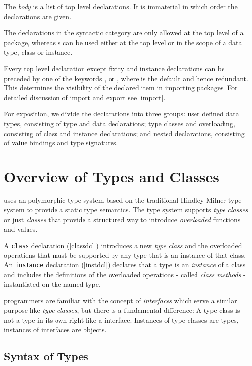
The \emph{body} is a list of top level declarations. It is immaterial in which order the declarations are given.

The declarations in the syntactic category  are only allowed at the top level of a \frege{} package, whereas s can be used either at the top level or in the scope of a data type, class or instance.

Every top level declaration except fixity and instance declarations can be preceded by one of the keywords ,  or , where  is the default and hence redundant. This determines the visibility of the declared item in importing packages. For detailed discussion of import and export see \autoref{import}.

For exposition, we divide the declarations into three groups: user defined data types, consisting of type and data declarations; type classes and overloading, consisting of class and instance declarations; and nested declarations, consisting of value bindings and type signatures.

\section{Overview of Types and Classes}
\frege{} uses an polymorphic type system based on the traditional Hindley-Milner type system \cite{ptifart} to provide a static type semantics. The type system supports \emph{type classes} or just \emph{classes} that provide a structured way to introduce \emph{overloaded} functions and values.

A \texttt{class} declaration (\autoref{classdcl}) introduces a new \emph{type class} and the overloaded operations that must be supported by any type that is an instance of that class. An \texttt{instance} declaration (\autoref{instdcl}) declares that a type is an \emph{instance} of a class and includes the definitions of the overloaded operations - called \emph{class methods} - instantiated on the named type.  

\java{} programmers are familiar with the concept of \emph{interfaces} which serve a similar purpose like \emph{type classes}, but there is a fundamental difference: A \frege{} type class is not a type in its own right like a \java{} interface. Instances of type classes are types, instances of \java{} interfaces are objects.

\subsection{Syntax of Types}   \label{typesyntax}

